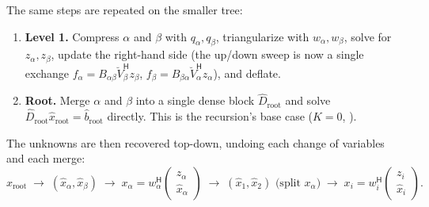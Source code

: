 \documentclass[11pt]{article}
\newcommand{\ct}{^{\mathsf H}}            %
\newcommand{\cV}{\breve V}
\newcommand{\hD}{\widehat D}
\newcommand{\hx}{\hat x}
\newcommand{\hb}{\hat b}
\theoremstyle{definition}
\begin{document}
The same steps are repeated on the smaller tree:
\begin{enumerate}
  \item \textbf{Level 1.} Compress $\alpha$ and $\beta$ with $q_\alpha,q_\beta$,
    triangularize with $w_\alpha,w_\beta$, solve for $z_\alpha,z_\beta$, update
    the right-hand side (the up/down sweep is now a single exchange
    $f_\alpha = B_{\alpha\beta}\cV_\beta\ct z_\beta$,
    $f_\beta = B_{\beta\alpha}\cV_\alpha\ct z_\alpha$), and deflate.
  \item \textbf{Root.} Merge $\alpha$ and $\beta$ into a single dense block
    $\hD_{\mathrm{root}}$ and solve $\hD_{\mathrm{root}}\hx_{\mathrm{root}} = \hb_{\mathrm{root}}$
    directly. This is the recursion's base case ($K=0$, \cite[Section~4.3]{CGP06}).
\end{enumerate}
The unknowns are then recovered top-down, undoing each change of variables and
each merge:
\[
\hx_{\mathrm{root}} \;\to\; (\hx_\alpha,\hx_\beta)
\;\to\; x_\alpha = w_\alpha\ct\begin{pmatrix} z_\alpha\\ \hx_\alpha\end{pmatrix}
\;\to\; (\hx_1,\hx_2) \text{ (split } x_\alpha)
\;\to\; x_i = w_i\ct\begin{pmatrix} z_i\\ \hx_i\end{pmatrix}.
\]
\end{document}
